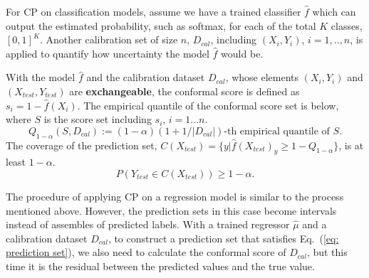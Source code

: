 For CP on classification models, assume we have a trained classifier $\hat{f}$ which can output the estimated probability, such as softmax, for each of the total $K$ classes, $[0,1]^K$. Another calibration set of size $n$, $D_{cal}$, including $(X_i,Y_i)$, $i=1,..,n$, is applied to quantify how uncertainty the model $\hat{f}$ would be. 
\begin{theorem}
With the model $\hat{f}$ and the calibration dataset $D_{cal}$, whose elements $(X_i,Y_i)$ and $(X_{test}, Y_{test})$ are \textbf{exchangeable}, the conformal score is defined as $s_i = 1-\hat{f}(X_i)$. The empirical quantile of the conformal score set is below, where $S$ is the score set including $s_i$, $i=1...n$.
 \begin{equation} \label{eq: S quantile}
Q_{1-\alpha}(S,D_{cal}):=(1-\alpha)(1+1/|D_{cal}|)\text{-th empirical quantile of }S.
 \end{equation} 
The coverage of the prediction set, $C(X_{test})=\{y|\hat{f}(X_{test})_y\ge 1-Q_{1-\alpha}\}$, is at least $1-\alpha$.
\begin{equation} \label{eq: prediction set}
P(Y_{test}\in C(X_{test})) \ge 1-\alpha.
\end{equation}






\end{theorem}
The procedure of applying CP on a regression model is similar to the process mentioned above. However, the prediction sets in this case become intervals instead of assembles of predicted labels. With a trained regressor $\hat{\mu}$ and a calibration dataset $D_{cal}$, to construct a prediction set that satisfies Eq.~(\ref{eq: prediction set}), we also need to calculate the conformal score of $D_{cal}$, but this time it is the residual between the predicted values and the true value.
